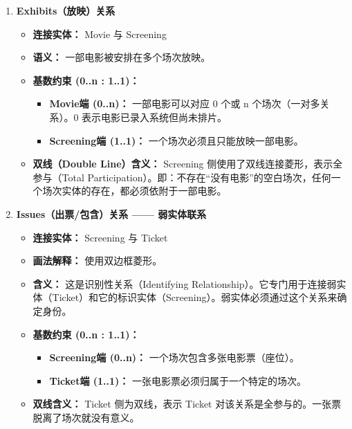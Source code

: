 \documentclass[a4paper]{article}
\begin{document}
\begin{enumerate}
    \item \textbf{Exhibits（放映）关系}
    \begin{itemize}
        \item \textbf{连接实体：} Movie 与 Screening
        \item \textbf{语义：} 一部电影被安排在多个场次放映。
        \item \textbf{基数约束 (0..n : 1..1)：}
        \begin{itemize}
            \item \textbf{Movie端 (0..n)：} 一部电影可以对应 0 个或 n 个场次（一对多关系）。0 表示电影已录入系统但尚未排片。
            \item \textbf{Screening端 (1..1)：} 一个场次必须且只能放映一部电影。
        \end{itemize}
        \item \textbf{双线（Double Line）含义：} Screening 侧使用了双线连接菱形，表示全参与（Total Participation）。即：不存在“没有电影”的空白场次，任何一个场次实体的存在，都必须依附于一部电影。
    \end{itemize}

    \item \textbf{Issues（出票/包含）关系 —— 弱实体联系}
    \begin{itemize}
        \item \textbf{连接实体：} Screening 与 Ticket
        \item \textbf{画法解释：} 使用双边框菱形。
        \item \textbf{含义：} 这是识别性关系（Identifying Relationship）。它专门用于连接弱实体（Ticket）和它的标识实体（Screening）。弱实体必须通过这个关系来确定身份。
        \item \textbf{基数约束 (0..n : 1..1)：}
        \begin{itemize}
            \item \textbf{Screening端 (0..n)：} 一个场次包含多张电影票（座位）。
            \item \textbf{Ticket端 (1..1)：} 一张电影票必须归属于一个特定的场次。
        \end{itemize}
        \item \textbf{双线含义：} Ticket 侧为双线，表示 Ticket 对该关系是全参与的。一张票脱离了场次就没有意义。
    \end{itemize}


\end{enumerate}
\end{document}
